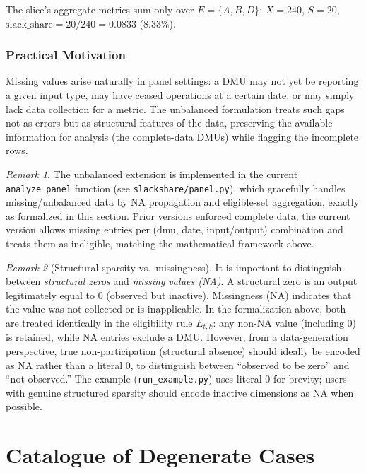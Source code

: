 \documentclass[11pt]{article}
\theoremstyle{definition}
\theoremstyle{plain}
\theoremstyle{remark}
\newtheorem{remark}{Remark}
\begin{document}
The slice's aggregate metrics sum only over $E = \{A, B, D\}$: $X = 240$, $S = 20$, $\text{slack\_share} = 20/240 = 0.0833$ (8.33\%).

\subsubsection{Practical Motivation}

Missing values arise naturally in panel settings: a DMU may not yet be reporting a given input type, may have ceased operations at a certain date, or may simply lack data collection for a metric. The unbalanced formulation treats such gaps not as errors but as structural features of the data, preserving the available information for analysis (the complete-data DMUs) while flagging the incomplete rows.

\begin{remark}
The unbalanced extension is implemented in the current \texttt{analyze\_panel} function (see \texttt{slackshare/panel.py}), which gracefully handles missing/unbalanced data by NA propagation and eligible-set aggregation, exactly as formalized in this section. Prior versions enforced complete data; the current version allows missing entries per (dmu, date, input/output) combination and treats them as ineligible, matching the mathematical framework above.
\end{remark}

\begin{remark}[Structural sparsity vs.~missingness]
It is important to distinguish between \emph{structural zeros} and \emph{missing values (NA)}. A structural zero is an output legitimately equal to 0 (observed but inactive). Missingness (NA) indicates that the value was not collected or is inapplicable. In the formalization above, both are treated identically in the eligibility rule $E_{t,k}$: any non-NA value (including 0) is retained, while NA entries exclude a DMU. However, from a data-generation perspective, true non-participation (structural absence) should ideally be encoded as NA rather than a literal 0, to distinguish between ``observed to be zero'' and ``not observed.'' The example (\texttt{run\_example.py}) uses literal 0 for brevity; users with genuine structured sparsity should encode inactive dimensions as NA when possible.
\end{remark}

\section{Catalogue of Degenerate Cases}
\end{document}
